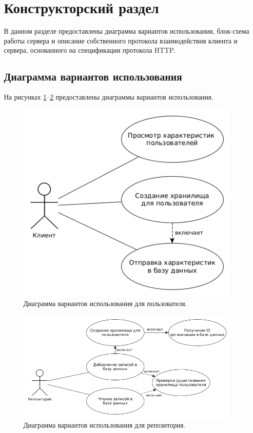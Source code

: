 \section{Конструкторский раздел}
В данном разделе предоставлены диаграмма вариантов использования, блок-схема работы сервера и описание собственного протокола взаимодействия клиента и сервера, основанного на спецификации протокола HTTP.

\subsection{Диаграмма вариантов использования}
На рисунках \ref{fig:useCase}--\ref{fig:useCaseRepo} предоставлены диаграммы вариантов использования.

\begin{figure}[H]
	\centering
	\includegraphics[scale=0.5]{img/useCase.png}
	\caption{Диаграмма вариантов использования для пользователя. }
	\label{fig:useCase}
\end{figure}

\begin{figure}[H]
	\centering
	\includegraphics[scale=0.5]{img/useCaseServer.png}
	\caption{Диаграмма вариантов использования для репозитория. }
	\label{fig:useCaseRepo}
\end{figure}

